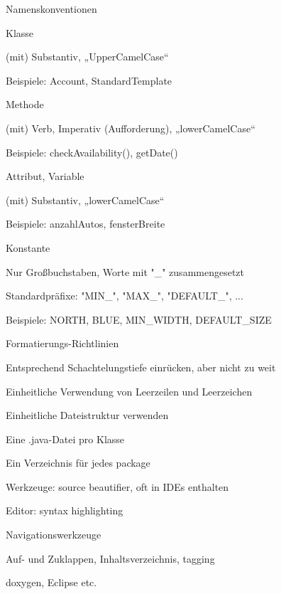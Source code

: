 \documentclass[a4paper]{article}
\begin{document}
\begin{multicols}{3}
  Namenskonventionen
  \begin{itemize*}
    \item Klasse
    \begin{itemize*}
      \item (mit) Substantiv, „UpperCamelCase“
      \item Beispiele: Account, StandardTemplate
    \end{itemize*}
    \item Methode
    \begin{itemize*}
      \item (mit) Verb, Imperativ (Aufforderung), „lowerCamelCase“
      \item Beispiele: checkAvailability(), getDate()
    \end{itemize*}
    \item Attribut, Variable
    \begin{itemize*}
      \item (mit) Substantiv, „lowerCamelCase“
      \item Beispiele: anzahlAutos, fensterBreite
    \end{itemize*}
    \item Konstante
    \begin{itemize*}
      \item Nur Großbuchstaben, Worte mit "\_" zusammengesetzt
      \item Standardpräfixe: "MIN\_", "MAX\_", "DEFAULT\_", ...
      \item Beispiele: NORTH, BLUE, MIN\_WIDTH, DEFAULT\_SIZE
    \end{itemize*}
  \end{itemize*}

  Formatierungs-Richtlinien
  \begin{itemize*}
    \item Entsprechend Schachtelungstiefe einrücken, aber nicht zu weit
    \item Einheitliche Verwendung von Leerzeilen und Leerzeichen
    \item Einheitliche Dateistruktur verwenden
    \begin{itemize*}
      \item Eine .java-Datei pro Klasse
      \item Ein Verzeichnis für jedes package
    \end{itemize*}
    \item Werkzeuge: source beautifier, oft in IDEs enthalten
    \item Editor: syntax highlighting
    \item Navigationswerkzeuge
    \begin{itemize*}
      \item Auf- und Zuklappen, Inhaltsverzeichnis, tagging
      \item doxygen, Eclipse etc.
    \end{itemize*}
  \end{itemize*}


\end{multicols}
\end{document}
